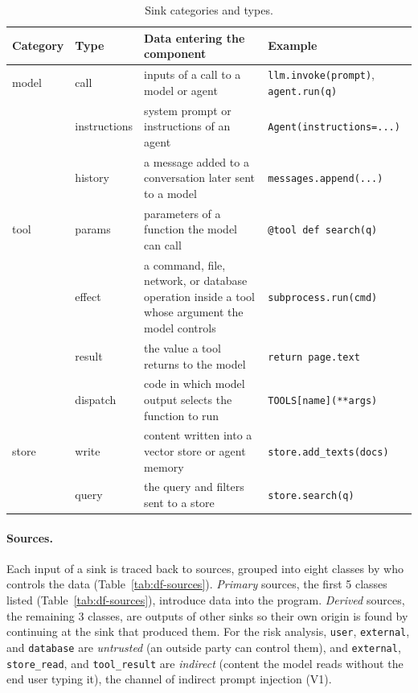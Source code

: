 \begin{table}[t]
\centering
\footnotesize
\renewcommand{\arraystretch}{1.2}
\setlength{\tabcolsep}{4pt}
\caption{Sink categories and types.}
\label{tab:df-sinks}
\begin{tabular}{@{}>{\raggedright\arraybackslash}p{}>{\raggedright\arraybackslash}p{}>{\raggedright\arraybackslash}p{}>{\raggedright\arraybackslash}p{}@{}}
\toprule
\textbf{Category} & \textbf{Type} & \textbf{Data entering the component} & \textbf{Example} \\
\midrule
model & call & inputs of a call to a model or agent & \texttt{llm.invoke(prompt)}, \texttt{agent.run(q)} \\
      & instructions & system prompt or instructions of an agent & \texttt{Agent(instructions=...)} \\
      & history & a message added to a conversation later sent to a model & \texttt{messages.append(...)} \\
\addlinespace[2pt]
tool  & params & parameters of a function the model can call & \texttt{@tool def search(q)} \\
      & effect & a command, file, network, or database operation inside a tool whose argument the model controls & \texttt{subprocess.run(cmd)} \\
      & result & the value a tool returns to the model & \texttt{return page.text} \\
      & dispatch & code in which model output selects the function to run & \texttt{TOOLS[name](**args)} \\
\addlinespace[2pt]
store & write & content written into a vector store or agent memory & \texttt{store.add\_texts(docs)} \\
      & query & the query and filters sent to a store & \texttt{store.search(q)} \\
\bottomrule
\end{tabular}
\end{table}

\paragraph{Sources.} Each input of a sink is traced back to sources, grouped into eight classes by who controls the data (Table~\ref{tab:df-sources}). 
\emph{Primary} sources, the first 5 classes listed (Table~\ref{tab:df-sources}), introduce data into the program. \emph{Derived} sources, the remaining 3 classes, are outputs of other sinks so their own origin is found by continuing at the sink that produced them.
For the risk analysis, \texttt{user}, \texttt{external}, and \texttt{database} are \emph{untrusted} (an outside party can control them), and \texttt{external}, \texttt{store\_read}, and \texttt{tool\_result} are \emph{indirect} (content the model reads without the end user typing it), the channel of indirect prompt injection (V1).

